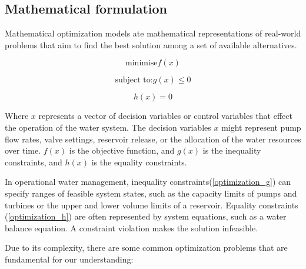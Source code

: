 \subsection{Mathematical formulation}

Mathematical optimization models ate mathematical representations of real-world problems that aim to find the best solution among a set of available alternatives.\cite{rfc28}

\begin{equation}\label{optimization}
\textrm{minimise} f(x)
\end{equation}

\begin{equation}\label{optimization_g}
\textrm{subject to:} g(x) \le 0
\end{equation}


\begin{equation}\label{optimization_h}
h(x) = 0
\end{equation}

Where $x$ represents a vector of decision variables or control variables that effect the operation of the water system. The decision variables $x$ might represent pump flow rates, valve settings, reservoir release, or the allocation of the water resources over time. $f(x)$ is the objective function, and $g(x)$ is the inequality constraints, and $h(x)$ is the equality constraints.

In operational water management, inequality constraints(\ref{optimization_g}) can specify ranges of feasible system states, such as the capacity limits of pumps and turbines or the upper and lower volume limits of a reservoir. Equality constraints (\ref{optimization_h}) are often represented by system equations, such as a water balance equation. A constraint violation makes the solution infeasible.

Due to its complexity, there are some common optimization problems that are fundamental for our understanding:

